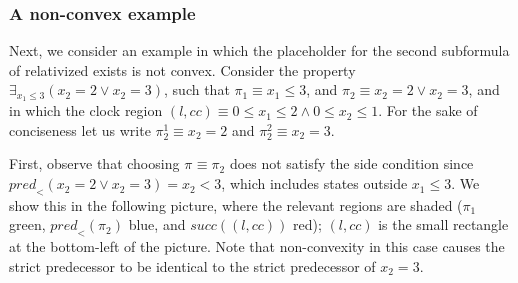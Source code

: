 \documentclass{article}
\newcommand{\placeholder}[1][]{\pi_{#1}}
\newcommand{\loc}{l}
\newcommand{\region}{\mathit{cc}}
\newcommand{\suc}{\mathit{succ}}
\newcommand{\pre}{\mathit{pred}}
\begin{document}
\subsubsection{A non-convex example}
Next, we consider an example in which the placeholder for the second subformula
of relativized exists is not convex. Consider the property 
 $\exists_{x_1 \leq 3}(x_2 = 2 \lor x_2 = 3)$, such that
 $\placeholder[1] \equiv x_1 \leq 3$, and $\placeholder[2] \equiv x_2 = 2 \lor 
 x_2 = 3$, and in which the clock region
 $(\loc, \region) \equiv 0 \leq x_1 \leq 2 \land 0 \leq x_2 \leq 1$.
 For the sake of conciseness let us write $\placeholder[2]^{1} \equiv x_2 = 2$ and
 $\placeholder[2]^2 \equiv x_2 = 3$.

First, observe that choosing $\placeholder \equiv \placeholder[2]$
does not satisfy the side condition since $\pre_{<}(x_2 = 2 \lor x _2 = 3) = x_2 < 3$, which includes states outside $x_1 \leq 3$. We show this in the following picture,
where the relevant regions are shaded ($\placeholder[1]$ green, 
$\pre_{<}(\placeholder[2])$ blue, and $\suc((\loc, \region))$ red);
$(\loc, \region)$ is the small rectangle at the bottom-left of the picture.
Note that non-convexity in this case causes the strict predecessor to be identical
to the strict predecessor of $x_2 = 3$.
\end{document}
